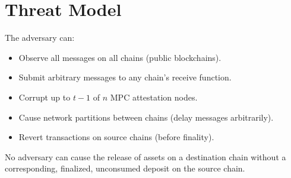 \section{Threat Model}


\begin{definition}
The adversary can:
\begin{itemize}[leftmargin=2em]
\item Observe all messages on all chains (public blockchains).
\item Submit arbitrary messages to any chain's receive function.
\item Corrupt up to $t-1$ of $n$ MPC attestation nodes.
\item Cause network partitions between chains (delay messages arbitrarily).
\item Revert transactions on source chains (before finality).
\end{itemize}
\end{definition}

\begin{definition}
No adversary can cause the release of assets on a destination chain without a corresponding, finalized, unconsumed deposit on the source chain.
\end{definition}

